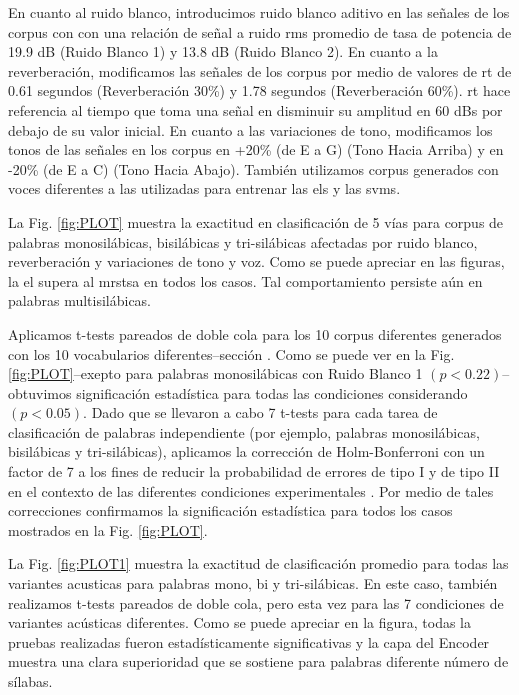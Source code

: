 {En cuanto al ruido blanco, introducimos ruido blanco aditivo en las señales de los corpus con con una relación de señal a ruido \gls{rms} promedio de tasa de potencia de 19.9 dB (Ruido Blanco 1) y 13.8 dB (Ruido Blanco 2). En cuanto a la reverberación, modificamos las señales de los corpus por medio de valores de \gls{rt} de 0.61 segundos (Reverberación 30\%) y 1.78 segundos (Reverberación 60\%). \gls{rt} hace referencia al tiempo que toma una señal en disminuir su amplitud en 60 dBs por debajo de su valor inicial. En cuanto a las variaciones de tono, modificamos los tonos de las señales en los corpus en +20\% (de E a G) (Tono Hacia Arriba) y en -20\% (de E a C) (Tono Hacia Abajo). También utilizamos corpus generados con voces diferentes a las utilizadas para entrenar las \glspl{el} y las \glspl{svm}.

La Fig. \ref{fig:PLOT} muestra la exactitud en clasificación de 5 vías para corpus de palabras monosilábicas, bisilábicas y tri-silábicas afectadas por ruido blanco, reverberación y variaciones de tono y voz. Como se puede apreciar en las figuras, la \gls{el} supera al \gls{mrstsa} en todos los casos. Tal comportamiento persiste aún en palabras multisilábicas.

Aplicamos t-tests pareados de doble cola para los 10 corpus diferentes generados con los 10 vocabularios diferentes--sección . Como se puede ver en la Fig. \ref{fig:PLOT}--exepto para palabras monosilábicas con Ruido Blanco 1 $(p < 0.22)$--obtuvimos significación estadística para todas las condiciones considerando $(p<0.05)$. 
Dado que se llevaron a cabo 7 t-tests para cada tarea de clasificación de palabras independiente (por ejemplo, palabras monosilábicas, bisilábicas y tri-silábicas), aplicamos la corrección de Holm-Bonferroni con un factor de 7 a los fines de reducir la probabilidad de errores de tipo I y de tipo II en el contexto de las diferentes condiciones experimentales \cite{10.1093/biomet/75.2.383}. Por medio de tales correcciones confirmamos la significación estadística para todos los casos mostrados en la Fig. \ref{fig:PLOT}.

La Fig. \ref{fig:PLOT1} muestra la exactitud de clasificación promedio para todas las variantes acusticas para palabras mono, bi y tri-silábicas.
En este caso, también realizamos t-tests pareados de doble cola, pero esta vez para las 7 condiciones de variantes acústicas diferentes.
Como se puede apreciar en la figura, todas la pruebas realizadas fueron estadísticamente significativas  y la capa del Encoder muestra una clara superioridad que se sostiene para palabras diferente número de sílabas.

}
